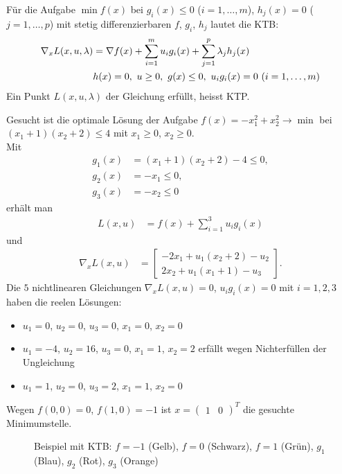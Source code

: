 Für die Aufgabe $\min f(x)$ bei $g_i(x)\le 0$ ($i=1,\ldots,m$), $h_j(x)=0$ ($j=1,\ldots,p$) mit stetig differenzierbaren $f$, $g_i$, $h_j$ lautet die \ac{KTB}:
\begin{align}
	\nabla_x L(x,u,\lambda) & = \nabla f(x)+\sum\limits_{i=1}^m u_ig_i(x)+\sum\limits_{j=1}^p\lambda_j h_j(x) \label{eq:kap_1_ktp}\\
	& h(x) = 0,\ u\ge 0,\ g(x)\le 0,\ u_ig_i(x)=0\ (i=1,\ldots,m) \notag
\end{align}
Ein Punkt $L(x,u,\lambda)$ der Gleichung  erfüllt, heisst \ac{KTP}.
\begin{exmp}
Gesucht ist die optimale Lösung der Aufgabe $f(x)=-x^2_1+x_2^2\rightarrow\min$ bei $(x_1+1)(x_2+2)\le 4$ mit $x_1\ge 0$, $x_2\ge 0$.\\
Mit 
\begin{align*}
	g_1(x) & = (x_1+1)(x_2+2)-4\le 0,\\
	g_2(x) & = -x_1\le 0,\\
	g_3(x) & = -x_2\le 0 
\end{align*}
erhält man
\begin{align*}
	L(x,u) & = f(x)+\sum\limits_{i=1}^3u_ig_i(x)
\end{align*}
und
\begin{align*}
\nabla_x L(x,u) & = \begin{bmatrix}
-2x_1+u_1(x_2+2)-u_2\\
2x_2+u_1(x_1+1)-u_3
\end{bmatrix}.
\end{align*}
Die $5$ nichtlinearen Gleichungen $\nabla_x L(x,u)=0$, $u_ig_i(x)=0$ mit $i=1,2,3$ haben die reelen Lösungen:
\begin{itemize}
	\item $u_1=0$, $u_2=0$, $u_3=0$, $x_1=0$, $x_2=0$
	\item $u_1=-4$, $u_2=16$, $u_3=0$, $x_1=1$, $x_2=2$ erfällt wegen Nichterfüllen der Ungleichung 
	\item $u_1=1$, $u_2=0$, $u_3=2$, $x_1=1$, $x_2=0$
\end{itemize}
Wegen $f(0,0)=0$, $f(1,0)=-1$ ist $x=\begin{pmatrix} 1 & 0 \end{pmatrix}^T$ die gesuchte Minimumstelle.
\begin{figure}[!htb]
	\centering
	
	\caption{Beispiel mit \ac{KTB}: $f=-1$ (Gelb), $f=0$ (Schwarz), $f=1$ (Grün), $g_1$ (Blau), $g_2$ (Rot), $g_3$ (Orange)}
	\label{fig:kap_1_ktp}
\end{figure}
\end{exmp}

